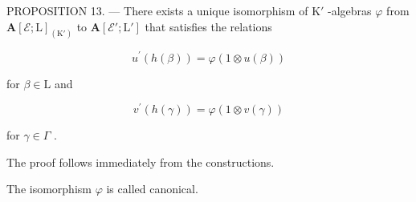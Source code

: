 PROPOSITION 13. --- There exists a unique isomorphism of \(\mathrm{K}'\) -algebras \(\varphi\) from \(\mathbf{A}[\mathcal{E};\mathrm{L}]_{(\mathrm{K}')}\) to \(\mathbf{A}[\mathcal{E}';\mathrm{L}']\) that satisfies the relations

\[
u ^ {\prime} (h (\beta)) = \varphi (1 \otimes u (\beta))\tag{36}
\]

for \(\beta \in \mathrm{L}\) and

\[
v ^ {\prime} (h (\gamma)) = \varphi (1 \otimes v (\gamma))\tag{37}
\]

for \(\gamma\in\Gamma\) .

The proof follows immediately from the constructions.

The isomorphism \(\varphi\) is called canonical.
